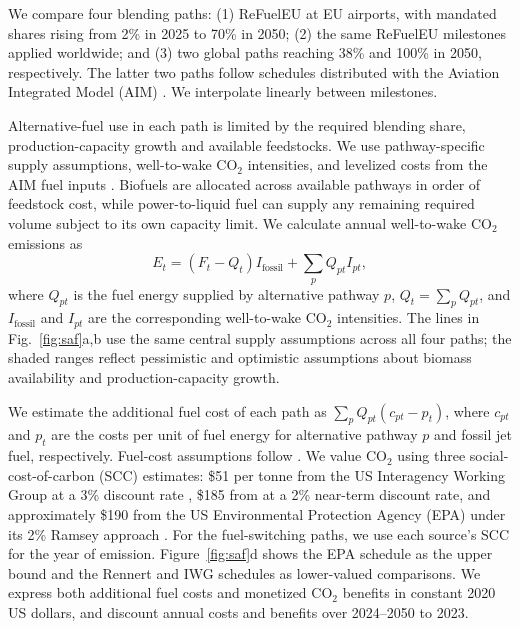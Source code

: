 \documentclass[12pt]{extarticle}
\begin{document}
We compare four blending paths: (1) ReFuelEU at EU airports, with mandated shares rising from 2\% in 2025 to 70\% in 2050; (2) the same ReFuelEU milestones applied worldwide; and (3) two global paths reaching 38\% and 100\% in 2050, respectively. The latter two paths follow schedules distributed with the Aviation Integrated Model (AIM) \citep{dray2022}. We interpolate linearly between milestones.

Alternative-fuel use in each path is limited by the required blending share, production-capacity growth and available feedstocks. We use pathway-specific supply assumptions, well-to-wake CO$_2$ intensities, and levelized costs from the AIM fuel inputs \citep{dray2019aim2015,dray2022}. Biofuels are allocated across available pathways in order of feedstock cost, while power-to-liquid fuel can supply any remaining required volume subject to its own capacity limit. We calculate annual well-to-wake CO$_2$ emissions as
\begin{equation}
E_t=(F_t-Q_t)I_{\mathrm{fossil}}+\sum_p Q_{pt}I_{pt},
\end{equation}
where $Q_{pt}$ is the fuel energy supplied by alternative pathway $p$, $Q_t=\sum_p Q_{pt}$, and $I_{\mathrm{fossil}}$ and $I_{pt}$ are the corresponding well-to-wake CO$_2$ intensities. The lines in Fig.~\ref{fig:saf}a,b use the same central supply assumptions across all four paths; the shaded ranges reflect pessimistic and optimistic assumptions about biomass availability and production-capacity growth.

We estimate the additional fuel cost of each path as $\sum_p Q_{pt}(c_{pt}-p_t)$, where $c_{pt}$ and $p_t$ are the costs per unit of fuel energy for alternative pathway $p$ and fossil jet fuel, respectively. Fuel-cost assumptions follow \citet{dray2022}. We value CO$_2$ using three social-cost-of-carbon (SCC) estimates: \$51 per tonne from the US Interagency Working Group at a 3\% discount rate \citep{iwg2021}, \$185 from \citet{rennert2022} at a 2\% near-term discount rate, and approximately \$190 from the US Environmental Protection Agency (EPA) under its 2\% Ramsey approach \citep{epa2023}. For the fuel-switching paths, we use each source's SCC for the year of emission. Figure~\ref{fig:saf}d shows the EPA schedule as the upper bound and the Rennert and IWG schedules as lower-valued comparisons. We express both additional fuel costs and monetized CO$_2$ benefits in constant 2020 US dollars, and discount annual costs and benefits over 2024--2050 to 2023.
\end{document}
